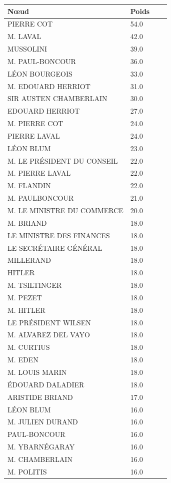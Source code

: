 \documentclass[a4paper,twoside,12pt]{book}
\begin{document}
\begin{table}[htbp]
\centering
\begin{tabular}{ll@{\hskip 1cm}ll}
\hline
\textbf{Nœud} &  \textbf{Poids} \\
\hline
PIERRE COT & 54.0 \\
M. LAVAL & 42.0 \\
MUSSOLINI & 39.0 \\
M. PAUL-BONCOUR & 36.0 \\
LÉON BOURGEOIS & 33.0 \\
M. EDOUARD HERRIOT & 31.0 \\
SIR AUSTEN CHAMBERLAIN & 30.0 \\
EDOUARD HERRIOT & 27.0 \\
M. PIERRE COT & 24.0 \\
PIERRE LAVAL & 24.0 \\
LÉON BLUM & 23.0 \\
M. LE PRÉSIDENT DU CONSEIL & 22.0 \\
M. PIERRE LAVAL & 22.0 \\
M. FLANDIN & 22.0 \\
M. PAULBONCOUR & 21.0 \\
M. LE MINISTRE DU COMMERCE & 20.0 \\
M. BRIAND & 18.0 \\
LE MINISTRE DES FINANCES & 18.0 \\
LE SECRÉTAIRE GÉNÉRAL & 18.0 \\
MILLERAND & 18.0 \\
HITLER & 18.0 \\
M. TSILTINGER & 18.0 \\
M. PEZET & 18.0 \\
M. HITLER & 18.0 \\
LE PRÉSIDENT WILSEN & 18.0 \\
M. ALVAREZ DEL VAYO & 18.0 \\
M. CURTIUS & 18.0 \\
M. EDEN & 18.0 \\
M. LOUIS MARIN & 18.0 \\
ÉDOUARD DALADIER & 18.0 \\
ARISTIDE BRIAND & 17.0 \\
LÉON BLUM & 16.0 \\
M. JULIEN DURAND & 16.0 \\
PAUL-BONCOUR & 16.0 \\
M. YBARNÉGARAY & 16.0 \\
M. CHAMBERLAIN & 16.0 \\
M. POLITIS & 16.0 \\

\end{tabular}
\end{table}
\end{document}
